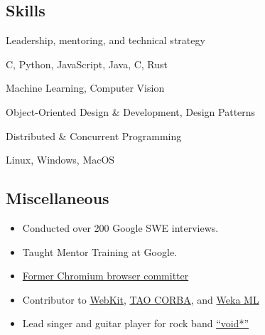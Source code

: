 \documentclass[10pt]{article}
\newcommand{\Rplus}{\protect\hspace{-.1em}\protect\raisebox{.35ex}{\smaller{\smaller\textbf{+}}}}
\newcommand{\Cpp}{\mbox{C\Rplus\Rplus}\xspace}
\begin{document}
\begin{multicols}{2}

\subsection*{Skills}
\begin{itemize}
  \begin{item}
	  Leadership, mentoring, and technical strategy
  \end{item}
  \begin{item}
	  \Cpp, Python, JavaScript, Java, C, Rust
  \end{item}
  \begin{item}
	  Machine Learning, Computer Vision
  \end{item}
  \begin{item}
	  Object-Oriented Design \& Development, Design Patterns
  \end{item}
  \begin{item}
	  Distributed \& Concurrent Programming
  \end{item}
  \begin{item}
	  Linux, Windows, MacOS
  \end{item}
\end{itemize}
\columnbreak
\noindent

\subsection*{Miscellaneous}
\begin{itemize}
	\item{Conducted over 200 Google SWE interviews.}
	\item{Taught Mentor Training at Google.}
	\item{\href{https://bugs.chromium.org/u/dmichael@chromium.org/updates}{Former Chromium browser committer}}
	\item{Contributor to \href{https://trac.webkit.org/search?q=dmichael&noquickjump=1&changeset=on&wiki=on}{WebKit}, \href{https://www.dre.vanderbilt.edu/~schmidt/ACE-members.html}{TAO CORBA}, and \href{https://weka.sourceforge.io/doc.packages/ensembleLibrary/weka/classifiers/meta/EnsembleSelection.html}{Weka ML}}
  \item{Lead singer and guitar player for rock band \href{http://voidstarband.com}{``void*''}}
\end{itemize}

\end{multicols}
\end{document}
